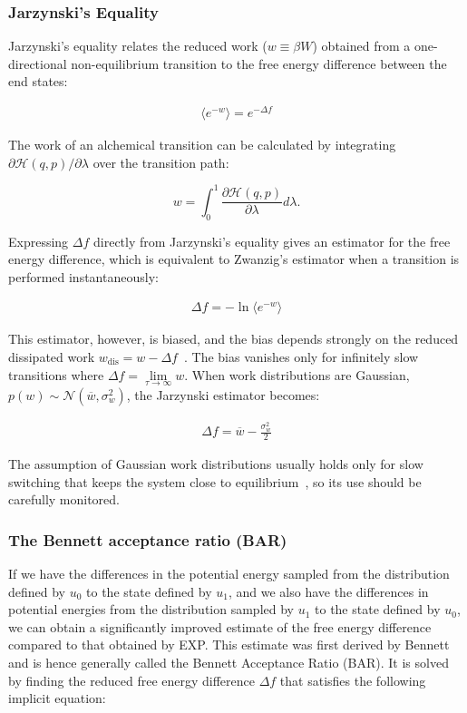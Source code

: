 \subsubsection{Jarzynski's Equality}
Jarzynski's equality relates the reduced work ($w \equiv \beta W$) obtained from a one-directional non-equilibrium transition to the free energy difference between the end states:

\begin{eqnarray}\label{eqn.jarzynski}
\langle e^{-w} \rangle =e^{-\Delta f}
\end{eqnarray}

The work of an alchemical transition can be calculated by integrating $\partial \mathcal{H}(q,p)/\partial\lambda$ over the transition path:

\begin{equation}\label{eqn.work_value}
w   = \int_{0}^{1} \frac{\partial \mathcal{H}(q,p)}{\partial\lambda} d\lambda.  
\end{equation}

Expressing $\Delta f$ directly from Jarzynski's equality gives an estimator for the free energy difference, which is equivalent to Zwanzig's estimator when a transition is performed instantaneously:

\begin{eqnarray}\label{eqn.jarzynski_estimator}
\Delta f = -\ln\langle e^{-w} \rangle
\end{eqnarray}

This estimator, however, is biased, and the bias depends strongly on the reduced dissipated work $w_{\mathrm{dis}}=w-\Delta f$~\cite{gore2003bias}.
The bias vanishes only for infinitely slow transitions where $\Delta f = \lim\limits_{\tau \to \infty} w$.
When work distributions are Gaussian, $p(w) \sim \mathcal{N}(\overline{w},\sigma_w^2)$, the Jarzynski estimator becomes:

\begin{eqnarray}\label{eqn.jarzynski_gaussian}
\Delta f = \overline{w} - \frac{\sigma_w^2}{2}
\end{eqnarray}

The assumption of Gaussian work distributions usually holds only for slow switching that keeps the system close to equilibrium~\cite{jarzynski1997nonequilibrium}, so its use should be carefully monitored.

\subsubsection{The Bennett acceptance ratio (BAR)}
If we have the differences in the potential energy sampled from the distribution defined by $u_0$ to the state defined by $u_1$, and we also have the differences in potential energies from the distribution sampled by $u_1$ to the state defined by $u_0$, we can obtain a significantly improved estimate of the
free energy difference compared to that obtained by EXP. 
This estimate was first derived by Bennett and is hence generally called the Bennett Acceptance Ratio (BAR). It is solved by finding the reduced free energy difference $\Delta f$ that satisfies the following implicit equation:

